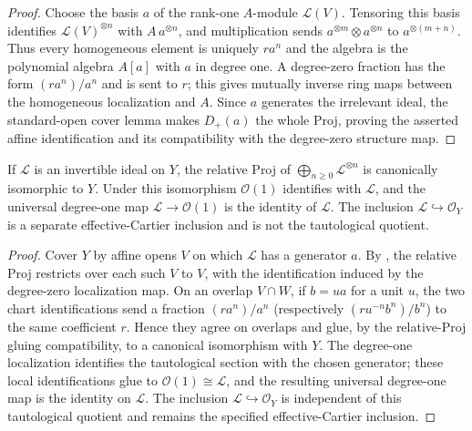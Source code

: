 \begin{proof}
  Choose the basis $a$ of the rank-one $A$-module $\mathcal L(V)$.  Tensoring
  this basis identifies $\mathcal L(V)^{\otimes n}$ with $A\,a^{\otimes n}$,
  and multiplication sends $a^{\otimes m}\otimes a^{\otimes n}$ to
  $a^{\otimes(m+n)}$.  Thus every homogeneous element is uniquely $r a^n$
  and the algebra is the polynomial algebra $A[a]$ with $a$ in degree one.
  A degree-zero fraction has the form $(r a^n)/a^n$ and is sent to $r$;
  this gives mutually inverse ring maps between the homogeneous localization
  and $A$.  Since $a$ generates the irrelevant ideal, the standard-open cover
  lemma makes $D_+(a)$ the whole Proj, proving the asserted affine
  identification and its compatibility with the degree-zero structure map.
\end{proof}

\begin{lemma}
  \label{lemma:nagata-relative-proj-invertible-tensor-powers}

  If $\mathcal L$ is an invertible ideal on $Y$, the relative Proj of
  $\bigoplus_{n\geq0}\mathcal L^{\otimes n}$ is canonically isomorphic to $Y$.
  Under this isomorphism $\mathcal O(1)$ identifies with $\mathcal L$, and
  the universal degree-one map $\mathcal L\to\mathcal O(1)$ is the identity
  of $\mathcal L$.  The inclusion
  $\mathcal L\hookrightarrow\mathcal O_Y$ is a separate effective-Cartier
  inclusion and is not the tautological quotient.
\end{lemma}

\begin{proof}
  Cover $Y$ by affine opens $V$ on which $\mathcal L$ has a generator $a$.
  By , the
  relative Proj restricts over each such $V$ to $V$, with the identification
  induced by the degree-zero localization map.  On an overlap $V\cap W$, if
  $b=ua$ for a unit $u$, the two chart identifications send a fraction
  $(r a^n)/a^n$ (respectively $(r u^{-n}b^n)/b^n$) to the same coefficient $r$.
  Hence they agree on overlaps and glue, by the relative-Proj gluing
  compatibility, to a canonical isomorphism with $Y$.  The degree-one
  localization identifies the tautological section with the chosen generator;
  these local identifications glue to $\mathcal O(1)\cong\mathcal L$, and the
  resulting universal degree-one map is the identity on $\mathcal L$.  The
  inclusion $\mathcal L\hookrightarrow\mathcal O_Y$ is independent of this
  tautological quotient and remains the specified effective-Cartier inclusion.
\end{proof}

